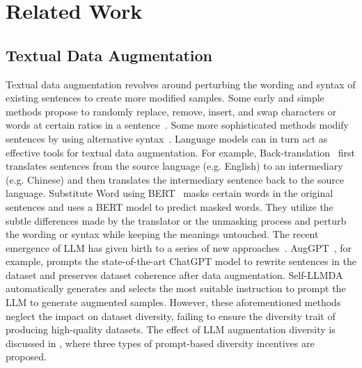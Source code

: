 \section{Related Work}
\vspace{-2mm}
\subsection{Textual Data Augmentation}
\vspace{-1mm}
Textual data augmentation revolves around perturbing the wording and syntax of existing sentences to create more modified samples. 
Some early and simple methods propose to randomly replace, remove, insert, and swap characters or words at certain ratios in a sentence~\cite{belinkov2018synthetic,wei2019eda}. 
Some more sophisticated methods modify sentences by using alternative syntax~\cite{min2020syntactic}. 
Language models can in turn act as effective tools for textual data augmentation. 
For example, Back-translation~\cite{sennrich2015improving} first translates sentences from the source language (e.g. English) to an intermediary (e.g. Chinese) and then translates the intermediary sentence back to the source language. 
Substitute Word using BERT~\cite{kumar2020data} masks certain words in the original sentences and uses a BERT model to predict masked words. 
They utilize the subtle differences made by the translator or the unmasking process and perturb the wording or syntax while keeping the meanings untouched. 
The recent emergence of LLM has given birth to a series of new approaches~\cite{anaby2020not,cai2023resolving,ding2024data,wang2024survey}. 
AugGPT~\cite{dai2025auggpt}, for example, prompts the state-of-the-art ChatGPT model to rewrite sentences in the dataset and preserves dataset coherence after data augmentation. 
Self-LLMDA~\cite{li2024empowering} automatically generates and selects the most suitable instruction to prompt the LLM to generate augmented samples. 
However, these aforementioned methods neglect the impact on dataset diversity, failing to ensure the diversity trait of producing high-quality datasets. 
The effect of LLM augmentation diversity is discussed in \cite{cegin2023chatgpt,cegin2024effects}, where three types of prompt-based diversity incentives are proposed. 


\vspace{-0.2cm}
